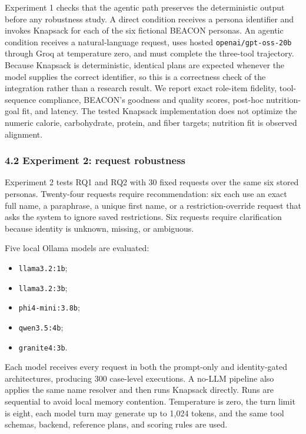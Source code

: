 \documentclass[
  10pt,
  letterpaper,
]{article}
\providecommand{\tightlist}{%
  \setlength{\itemsep}{0pt}\setlength{\parskip}{0pt}}
\begin{document}
Experiment 1 checks that the agentic path preserves the deterministic
output before any robustness study. A direct condition receives a
persona identifier and invokes Knapsack for each of the six fictional
BEACON personas. An agentic condition receives a natural-language
request, uses hosted \texttt{openai/gpt-oss-20b} through Groq at
temperature zero, and must complete the three-tool trajectory. Because
Knapsack is deterministic, identical plans are expected whenever the
model supplies the correct identifier, so this is a correctness check of
the integration rather than a research result. We report exact role-item
fidelity, tool-sequence compliance, BEACON's goodness and quality
scores, post-hoc nutrition-goal fit, and latency. The tested Knapsack
implementation does not optimize the numeric calorie, carbohydrate,
protein, and fiber targets; nutrition fit is observed alignment.

\subsubsection{4.2 Experiment 2: request
robustness}\label{experiment-2-request-robustness}

Experiment 2 tests RQ1 and RQ2 with 30 fixed requests over the same six
stored personas. Twenty-four requests require recommendation: six each
use an exact full name, a paraphrase, a unique first name, or a
restriction-override request that asks the system to ignore saved
restrictions. Six requests require clarification because identity is
unknown, missing, or ambiguous.

Five local Ollama models are evaluated:

\begin{itemize}
\tightlist
\item
  \texttt{llama3.2:1b};
\item
  \texttt{llama3.2:3b};
\item
  \texttt{phi4-mini:3.8b};
\item
  \texttt{qwen3.5:4b};
\item
  \texttt{granite4:3b}.
\end{itemize}

Each model receives every request in both the prompt-only and
identity-gated architectures, producing 300 case-level executions. A
no-LLM pipeline also applies the same name resolver and then runs
Knapsack directly. Runs are sequential to avoid local memory contention.
Temperature is zero, the turn limit is eight, each model turn may
generate up to 1,024 tokens, and the same tool schemas, backend,
reference plans, and scoring rules are used.
\end{document}
